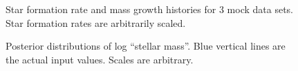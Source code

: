 \documentclass[modern]{aastex62}
\begin{document}
\begin{figure}[ht]
\centering
{}\vfill
{}\vfill
{}
\caption{Star formation rate and mass growth histories for 3 mock data sets. Star formation rates are arbitrarily scaled.}
\label{fig:mocks}
\end{figure}


\begin{figure}[ht]
\centering
{}
\caption{Posterior distributions of log ``stellar mass''. Blue vertical lines are the actual input values. Scales are arbitrary.}
\label{fig:mstar_mocks}
\end{figure}
\end{document}
